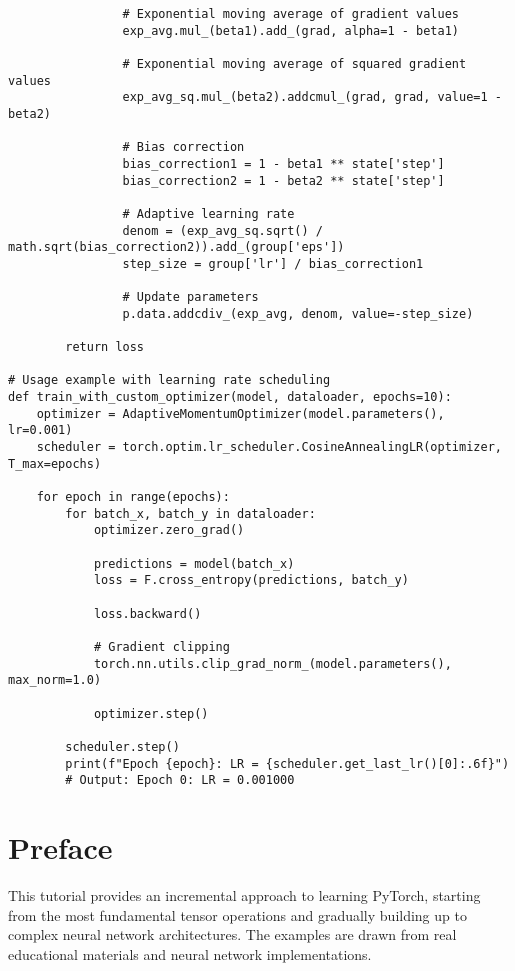 \documentclass[11pt,a4paper]{book}
\begin{document}
\begin{verbatim}
                # Exponential moving average of gradient values
                exp_avg.mul_(beta1).add_(grad, alpha=1 - beta1)
                
                # Exponential moving average of squared gradient values
                exp_avg_sq.mul_(beta2).addcmul_(grad, grad, value=1 - beta2)
                
                # Bias correction
                bias_correction1 = 1 - beta1 ** state['step']
                bias_correction2 = 1 - beta2 ** state['step']
                
                # Adaptive learning rate
                denom = (exp_avg_sq.sqrt() / math.sqrt(bias_correction2)).add_(group['eps'])
                step_size = group['lr'] / bias_correction1
                
                # Update parameters
                p.data.addcdiv_(exp_avg, denom, value=-step_size)
        
        return loss

# Usage example with learning rate scheduling
def train_with_custom_optimizer(model, dataloader, epochs=10):
    optimizer = AdaptiveMomentumOptimizer(model.parameters(), lr=0.001)
    scheduler = torch.optim.lr_scheduler.CosineAnnealingLR(optimizer, T_max=epochs)
    
    for epoch in range(epochs):
        for batch_x, batch_y in dataloader:
            optimizer.zero_grad()
            
            predictions = model(batch_x)
            loss = F.cross_entropy(predictions, batch_y)
            
            loss.backward()
            
            # Gradient clipping
            torch.nn.utils.clip_grad_norm_(model.parameters(), max_norm=1.0)
            
            optimizer.step()
        
        scheduler.step()
        print(f"Epoch {epoch}: LR = {scheduler.get_last_lr()[0]:.6f}")
        # Output: Epoch 0: LR = 0.001000
\end{verbatim}

\chapter{Preface}

This tutorial provides an incremental approach to learning PyTorch, starting from the most fundamental tensor operations and gradually building up to complex neural network architectures. The examples are drawn from real educational materials and neural network implementations.
\end{document}
